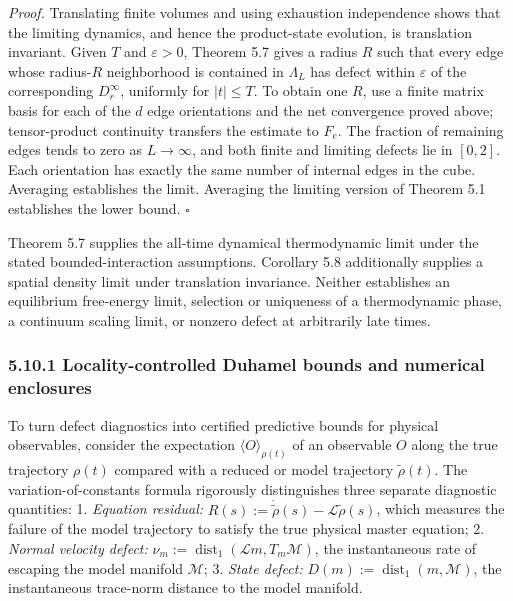\documentclass[
  11pt,
]{article}
\begin{document}
\emph{Proof.} Translating finite volumes and using exhaustion independence
shows that the limiting dynamics, and hence the product-state
evolution, is translation invariant. Given \(T\) and \(\varepsilon>0\),
Theorem 5.7 gives a radius \(R\) such that every edge whose
radius-\(R\) neighborhood is contained in \(\Lambda_L\) has defect
within \(\varepsilon\) of the corresponding \(D_r^\infty\), uniformly
for \(|t|\leq T\). To obtain one \(R\), use a finite matrix basis for
each of the \(d\) edge orientations and the net convergence proved
above; tensor-product continuity transfers the estimate to \(F_e\).
The fraction of remaining edges tends to zero as \(L\to\infty\),
and both finite and limiting defects lie in \([0,2]\). Each
orientation has exactly the same number of internal edges in the
cube. Averaging establishes the limit. Averaging the limiting version of
Theorem 5.1 establishes the lower bound. \(\square\)

Theorem 5.7 supplies the all-time dynamical thermodynamic limit under
the stated bounded-interaction assumptions. Corollary 5.8 additionally
supplies a spatial density limit under translation invariance.
Neither establishes an equilibrium free-energy limit, selection or
uniqueness of a thermodynamic phase, a continuum scaling limit, or
nonzero defect at arbitrarily late times.

\subsubsection{5.10.1 Locality-controlled Duhamel bounds and numerical enclosures}\label{locality-controlled-duhamel-bounds-and-numerical-enclosures}

To turn defect diagnostics into certified predictive bounds for physical observables, consider the expectation \(\langle O\rangle_{\rho(t)}\) of an observable \(O\) along the true trajectory \(\rho(t)\) compared with a reduced or model trajectory \(\widetilde\rho(t)\).
The variation-of-constants formula rigorously distinguishes three separate diagnostic quantities:
1. \emph{Equation residual:} \(R(s) := \dot{\widetilde\rho}(s) - \mathcal L\widetilde\rho(s)\), which measures the failure of the model trajectory to satisfy the true physical master equation;
2. \emph{Normal velocity defect:} \(\nu_m := \operatorname{dist}_1(\mathcal L m, T_m\mathcal M)\), the instantaneous rate of escaping the model manifold \(\mathcal M\);
3. \emph{State defect:} \(D(m) := \operatorname{dist}_1(m, \mathcal M)\), the instantaneous trace-norm distance to the model manifold.
\end{document}
